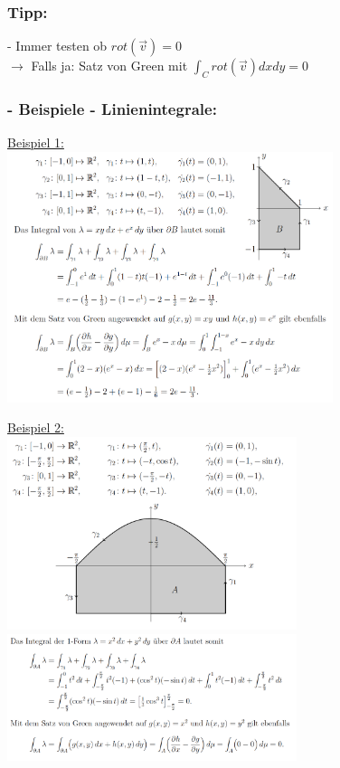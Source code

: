 \documentclass[6pt]{article}
\begin{document}
\begin{multicols*}{3}
		\subsubsection*{Tipp:}
		- Immer testen ob $rot(\vec{v})=0$ \\
		$\rightarrow$ Falls ja: Satz von Green mit $\int_{C} rot(\vec{v}) dxdy = 0$ 
		\columnbreak
		 
		
		\subsubsection*{- Beispiele - Linienintegrale:}
		
		\underline{Beispiel 1:}  \vspace{1mm}\\
		\includegraphics[width=270pt]{images/linienintegrale_bsp}
		
		
		\underline{Beispiel 2:} \vspace{1mm}\\
		\includegraphics[width=240pt]{images/linienintegrale_bsp1}
		\includegraphics[width=240pt]{images/linienintegrale_bsp2}
		

\end{multicols*}
\end{document}
